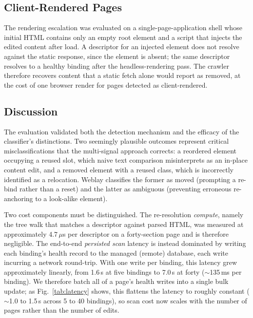 \documentclass[conference]{IEEEtran}
\begin{document}
\subsection{Client-Rendered Pages}
The rendering escalation was evaluated on a single-page-application shell whose initial HTML contains only an empty root element and a script that injects the edited content after load. A descriptor for an injected element does not resolve against the static response, since the element is absent; the same descriptor resolves to a healthy binding after the headless-rendering pass. The crawler therefore recovers content that a static fetch alone would report as removed, at the cost of one browser render for pages detected as client-rendered.

\subsection{Discussion}
The evaluation validated both the detection mechanism and the efficacy of the classifier's distinctions. Two seemingly plausible outcomes represent critical misclassifications that the multi-signal approach corrects: a reordered element occupying a reused slot, which naive text comparison misinterprets as an in-place content edit, and a removed element with a reused class, which is incorrectly identified as a relocation. Weblay classifies the former as moved (prompting a re-bind rather than a reset) and the latter as ambiguous (preventing erroneous re-anchoring to a look-alike element).

Two cost components must be distinguished. The re-resolution \emph{compute}, namely the tree walk that matches a descriptor against parsed HTML, was measured at approximately 4.7\,$\mu$s per descriptor on a forty-section page and is therefore negligible. The end-to-end \emph{persisted scan} latency is instead dominated by writing each binding's health record to the managed (remote) database, each write incurring a network round-trip. With one write per binding, this latency grew approximately linearly, from 1.6\,s at five bindings to 7.0\,s at forty ($\sim$135\,ms per binding). We therefore batch all of a page's health writes into a single bulk update; as Fig.~\ref{tab:latency} shows, this flattens the latency to roughly constant ($\sim$1.0 to 1.5\,s across 5 to 40 bindings), so scan cost now scales with the number of pages rather than the number of edits.
\end{document}
